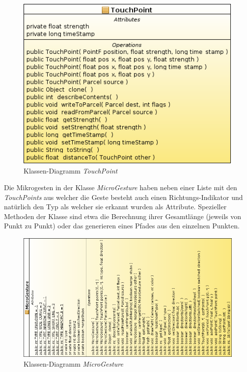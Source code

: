\begin{figure}[h!]
   \centering
   \includegraphics[scale=0.5]{img/uml_cd_tp} 
   \caption{Klassen-Diagramm \emph{TouchPoint}}
   \label{fig:cd_touchpoint}
\end{figure}

Die Mikrogesten in der Klasse \emph{MicroGesture} haben neben einer Liste mit den \emph{TouchPoints} aus welcher die Geste besteht auch einen Richtungs-Indikator und natürlich den Typ als welcher sie erkannt wurden als Attribute. Spezieller Methoden der Klasse sind etwa die Berechnung ihrer Gesamtlänge (jeweils von Punkt zu Punkt) oder das generieren eines Pfades aus den einzelnen Punkten.

\begin{figure}[h!]
   \centering
   \includegraphics[width=\textwidth]{img/uml_cd_mg} 
   \caption{Klassen-Diagramm \emph{MicroGesture}}
   \label{fig:cd_microgesture}
\end{figure}

